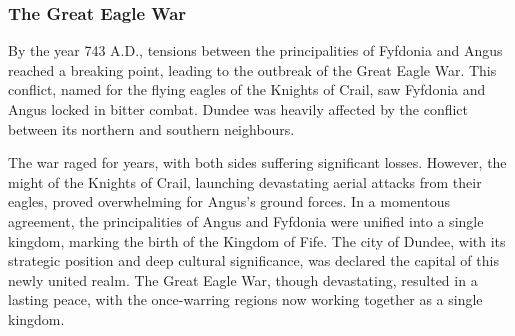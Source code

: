 \subsubsection*{The Great Eagle War}
{\entryfont By the year 743 A.D., tensions between the principalities of Fyfdonia and Angus reached a breaking point, leading to the outbreak of the Great Eagle War. This conflict, named for the flying eagles of the Knights of Crail, saw Fyfdonia and Angus locked in bitter combat. Dundee was heavily affected by the conflict between its northern and southern neighbours.

The war raged for years, with both sides suffering significant losses. However, the might of the Knights of Crail, launching devastating aerial attacks from their eagles, proved overwhelming for Angus's ground forces. In a momentous agreement, the principalities of Angus and Fyfdonia were unified into a single kingdom, marking the birth of the Kingdom of Fife. The city of Dundee, with its strategic position and deep cultural significance, was declared the capital of this newly united realm. The Great Eagle War, though devastating, resulted in a lasting peace, with the once-warring regions now working together as a single kingdom.}

